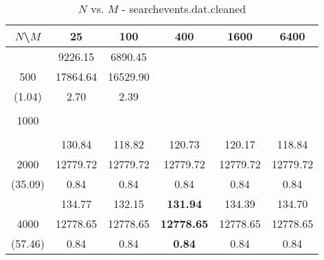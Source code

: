 \documentclass[conference]{IEEEtran}
\begin{document}
\begin{table}[th]
\caption{$N$ vs. $M$ - searchevents.dat.cleaned}
\label{tab:searchevents.dat.cleaned}
\centering
\begin{tabular}{|c||c|c|c|c|c|}
\hline
$N$\textbackslash $M$ & 25 & 100 & 400 & 1600 & 6400 \\ \hline \hline
  & 9226.15 & 6890.45 &  &  & \\ 
500  & 17864.64 & 16529.90 &  &  & \\ 
(1.04)  & 2.70 & 2.39 &  &  & \\ \hline 
  &  &  &  &  & \\ 
1000  &  &  &  &  & \\ 
  &  &  &  &  & \\ \hline 
  & 130.84 & 118.82 & 120.73 & 120.17 & 118.84\\ 
2000  & 12779.72 & 12779.72 & 12779.72 & 12779.72 & 12779.72\\ 
(35.09)  & 0.84 & 0.84 & 0.84 & 0.84 & 0.84\\ \hline 
  & 134.77 & 132.15 & {\bf 131.94} & 134.39 & 134.70\\ 
4000  & 12778.65 & 12778.65 & {\bf 12778.65} & 12778.65 & 12778.65\\ 
(57.46)  & 0.84 & 0.84 & {\bf 0.84} & 0.84 & 0.84\\ \hline 
\end{tabular}
\end{table}
\end{document}
